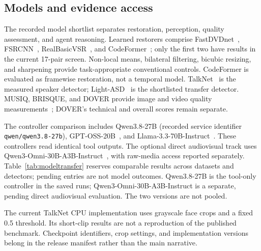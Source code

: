 \subsection{Models and evidence access}
The recorded model shortlist separates restoration, perception, quality assessment, and agent reasoning. Learned restorers comprise FastDVDnet~\cite{fastdvd}, FSRCNN~\cite{fsrcnn}, RealBasicVSR~\cite{realbasic}, and CodeFormer~\cite{codeformer}; only the first two have results in the current 17-pair screen. Non-local means, bilateral filtering, bicubic resizing, and sharpening provide task-appropriate conventional controls. CodeFormer is evaluated as framewise restoration, not a temporal model. TalkNet~\cite{talknet} is the measured speaker detector; Light-ASD~\cite{lightasd} is the shortlisted transfer detector. MUSIQ, BRISQUE, and DOVER provide image and video quality measurements~\cite{musiq,brisque,dover}; DOVER's technical and overall scores remain separate.

The controller comparison includes Qwen3.8-27B (recorded service identifier \texttt{qwen/qwen3.8-27b}), GPT-OSS-20B~\cite{gptoss}, and Llama-3.3-70B-Instruct~\cite{llama}. These controllers read identical tool outputs. The optional direct audiovisual track uses Qwen3-Omni-30B-A3B-Instruct~\cite{qwenomni}, with raw-media access reported separately. Table~\ref{tab:modeltransfer} reserves comparable results across datasets and detectors; pending entries are not model outcomes. Qwen3.8-27B is the tool-only controller in the saved runs; Qwen3-Omni-30B-A3B-Instruct is a separate, pending direct audiovisual evaluation. The two versions are not pooled.

The current TalkNet CPU implementation uses grayscale face crops and a fixed 0.5 threshold. Its short-clip results are not a reproduction of the published benchmark. Checkpoint identifiers, crop settings, and implementation versions belong in the release manifest rather than the main narrative. 

